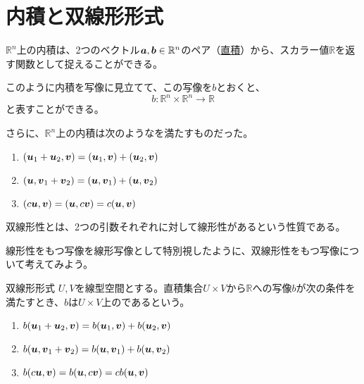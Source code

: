 \documentclass[../../../topic_linear-algebra]{subfiles}
\begin{document}
\sectionline
\section{内積と双線形形式}

$\mathbb{R}^n$上の内積は、2つのベクトル$\vb*{a}, \vb*{b} \in \mathbb{R}^n$のペア（\hyperref[sec:cartesian-product]{直積}）から、スカラー値$\mathbb{R}$を返す関数として捉えることができる。

このように内積を写像に見立てて、この写像を$b$とおくと、
\begin{equation*}
  b \colon \mathbb{R}^n \times \mathbb{R}^n \to \mathbb{R}
\end{equation*}
と表すことができる。

\br

さらに、$\mathbb{R}^n$上の内積は次のようなを満たすものだった。

\begin{enumerate}[label=\romanlabel]
  \item $(\vb*{u}_1 + \vb*{u}_2, \vb*{v}) = ( \vb*{u}_1, \vb*{v}) + ( \vb*{u}_2, \vb*{v})$
  \item $(\vb*{u}, \vb*{v}_1 + \vb*{v}_2) = (\vb*{u}, \vb*{v}_1) + (\vb*{u}, \vb*{v}_2)$
  \item $(c\vb*{u}, \vb*{v}) = (\vb*{u}, c\vb*{v}) = c(\vb*{u}, \vb*{v})$
\end{enumerate}

双線形性とは、2つの引数それぞれに対して線形性があるという性質である。

線形性をもつ写像を線形写像として特別視したように、双線形性をもつ写像について考えてみよう。

\begin{definition}{双線形形式}\label{def:bilinear-form}
  $U,V$を線型空間とする。直積集合$U \times V$から$\mathbb{R}$への写像$b$が次の条件を満たすとき、$b$は$U \times V$上のであるという。
  \begin{enumerate}[label=\romanlabel]
    \item $b(\vb*{u}_1 + \vb*{u}_2, \vb*{v}) = b(\vb*{u}_1, \vb*{v}) + b(\vb*{u}_2, \vb*{v})$
    \item $b(\vb*{u}, \vb*{v}_1 + \vb*{v}_2) = b(\vb*{u}, \vb*{v}_1) + b(\vb*{u}, \vb*{v}_2)$
    \item $b(c\vb*{u}, \vb*{v}) = b(\vb*{u}, c\vb*{v}) = cb(\vb*{u}, \vb*{v})$
  \end{enumerate}
\end{definition}
\end{document}
